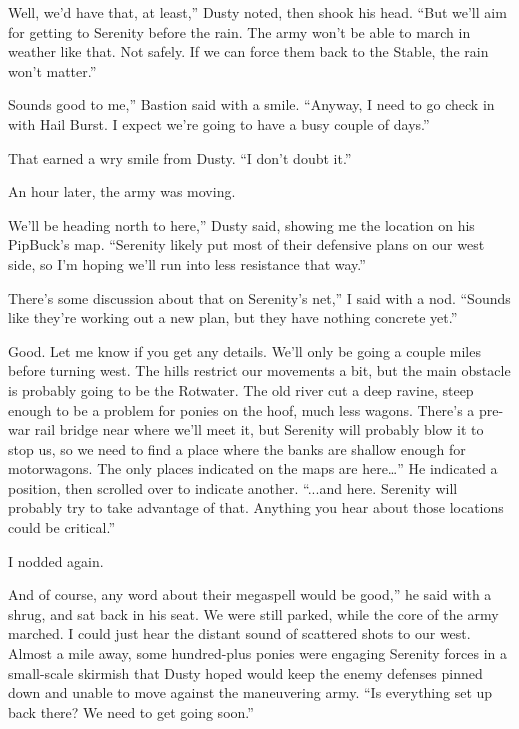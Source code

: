 \leavevmode{}Well, we’d have that, at least,” Dusty noted, then shook his head. “But we’ll aim for getting to Serenity before the rain. The army won’t be able to march in weather like that. Not safely. If we can force them back to the Stable, the rain won’t matter.”

\leavevmode{}Sounds good to me,” Bastion said with a smile. “Anyway, I need to go check in with Hail Burst. I expect we’re going to have a busy couple of days.”

That earned a wry smile from Dusty. “I don’t doubt it.”

{\br}%
An hour later, the army was moving.

\leavevmode{}We’ll be heading north to here,” Dusty said, showing me the location on his PipBuck’s map. “Serenity likely put most of their defensive plans on our west side, so I’m hoping we’ll run into less resistance that way.”

\leavevmode{}There’s some discussion about that on Serenity’s net,” I said with a nod. “Sounds like they’re working out a new plan, but they have nothing concrete yet.”

\leavevmode{}Good. Let me know if you get any details. We’ll only be going a couple miles before turning west. The hills restrict our movements a bit, but the main obstacle is probably going to be the Rotwater. The old river cut a deep ravine, steep enough to be a problem for ponies on the hoof, much less wagons. There’s a pre-war rail bridge near where we’ll meet it, but Serenity will probably blow it to stop us, so we need to find a place where the banks are shallow enough for motorwagons. The only places indicated on the maps are here…” He indicated a position, then scrolled over to indicate another. “...and here. Serenity will probably try to take advantage of that. Anything you hear about those locations could be critical.”

I nodded again.

\leavevmode{}And of course, any word about their megaspell would be good,” he said with a shrug, and sat back in his seat. We were still parked, while the core of the army marched. I could just hear the distant sound of scattered shots to our west. Almost a mile away, some hundred-plus ponies were engaging Serenity forces in a small-scale skirmish that Dusty hoped would keep the enemy defenses pinned down and unable to move against the maneuvering army. “Is everything set up back there? We need to get going soon.”

